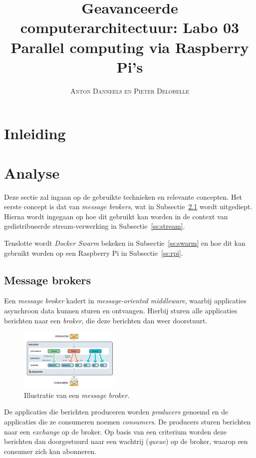 \documentclass[twocolumn, a4paper]{article}
\begin{document}
\title{Geavanceerde computerarchitectuur: Labo 03 \\ 
\large{Parallel computing via Raspberry Pi's}}
\author{\textsc{Anton Danneels en Pieter Delobelle}}
\date{}
\maketitle

\section{Inleiding}

\section{Analyse}
Deze sectie zal ingaan op de gebruikte technieken en relevante concepten. Het eerste concept is dat van \emph{message brokers}, wat in Subsectie~\ref{ss:broker} wordt uitgediept. Hierna wordt ingegaan op hoe dit gebruikt kan worden in de context van gedistribueerde stream-verwerking in Subsectie~\ref{ss:stream}. 

Tenslotte wordt \emph{Docker Swarm} bekeken in Subsectie~\ref{ss:swarm} en hoe dit kan gebruikt worden op een Raspberry Pi in Subsectie~\ref{ss:rpi}.

\subsection{Message brokers}\label{ss:broker}
Een \emph{message broker} kadert in \emph{message-oriented middleware}, waarbij applicaties asynchroon data kunnen sturen en ontvangen. Hierbij sturen alle applicaties berichten naar een \emph{broker}, die deze berichten dan weer doorstuurt.

\begin{figure}[htb]
    \centering
    \includegraphics[width=0.43\textwidth]{exchanges-topic-fanout-direct.png}
    \caption{Illustratie van een \emph{message broker}.}\label{fig:broker}
\end{figure}

De applicaties die berichten produceren worden \emph{producers} genoemd en de applicaties die ze consumeren noemen \emph{consumers}. De producers sturen berichten naar een \emph{exchange} op de broker. Op basis van een criterium worden deze berichten dan doorgestuurd naar een wachtrij (\emph{queue}) op de broker, waarop een consumer zich kan abonneren.
\end{document}
